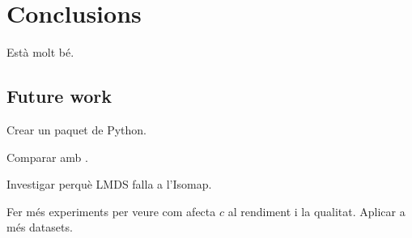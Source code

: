 \section{Conclusions}

Està molt bé.


\subsection{Future work}

Crear un paquet de Python.

Comparar amb \citet{Reichmann2024}.

Investigar perquè LMDS falla a l'Isomap.

Fer més experiments per veure com afecta $c$ al rendiment i la qualitat. Aplicar a més datasets.
